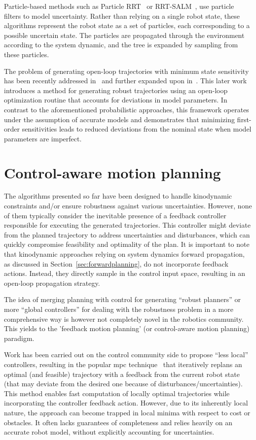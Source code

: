 Particle-based methods such as Particle RRT~\cite{cParticleRRT} or RRT-SALM~\cite{cSlamRRT}, use particle filters to model uncertainty. 
Rather than relying on a single robot state, these algorithms represent the robot state as a set of particles, each corresponding to a possible uncertain state. 
The particles are propagated through the environment according to the system dynamic, and the tree is expanded by sampling from these particles.

The problem of generating open-loop trajectories with minimum state sensitivity has been recently addressed in~\cite{cSensi1} and further expanded upon in~\cite{cSensi2}. 
This later work introduces a method for generating robust trajectories using an open-loop optimization routine that accounts for deviations in model parameters. 
In contrast to the aforementioned probabilistic approaches, this framework operates under the assumption of accurate models and demonstrates that minimizing first-order sensitivities leads to reduced deviations from the nominal state when model parameters are imperfect.

\section{Control-aware motion planning}

The algorithms presented so far have been designed to handle kinodynamic constraints and/or ensure robustness against various uncertainties.
However, none of them typically consider the inevitable presence of a feedback controller responsible for executing the generated trajectories. 
This controller might deviate from the planned trajectory to address uncertainties and disturbances, which can quickly compromise feasibility and optimality of the plan.
It is important to note that kinodynamic approaches relying on system dynamics forward propagation, as discussed in Section~\ref{sec:forwardplanning}, do not incorporate feedback actions.
Instead, they directly sample in the control input space, resulting in an open-loop propagation strategy.

The idea of merging planning with control for generating “robust planners” or more “global controllers” for dealing with the robustness problem in a more comprehensive way is however not completely novel in the robotics community.
This yields to the 'feedback motion planning' (or control-aware motion planning) paradigm.

Work has been carried out on the control community side to propose ``less local'' controllers, resulting in the popular \gls{mpc} technique~\cite{cMPC} that iteratively replans an optimal (and feasible) trajectory with a feedback from the current robot state (that may deviate from the desired one because of disturbances/uncertainties). 
This method enables fast computation of locally optimal trajectories while incorporating the controller feedback action. 
However, due to its inherently local nature, the  approach can become trapped in local minima with respect to cost or obstacles. 
It often lacks guarantees of completeness and relies heavily on an accurate robot model, without explicitly accounting for uncertainties.

